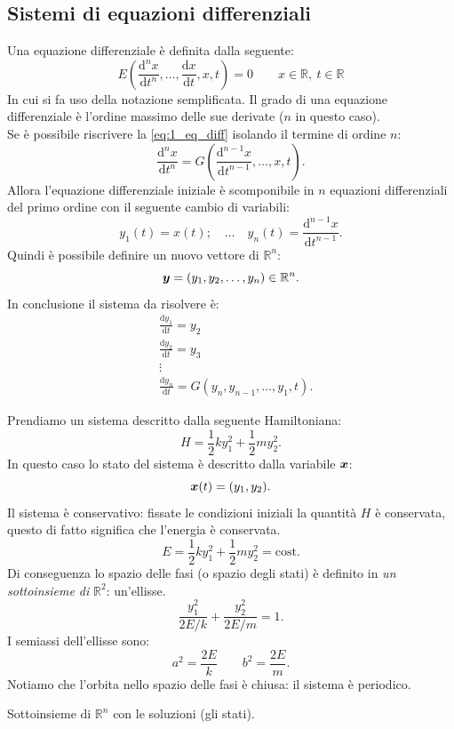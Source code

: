 \subsection{Sistemi di equazioni differenziali}%
\label{sub:Sistemi di equazioni differenziali}
Una equazione differenziale è definita dalla seguente:
\begin{equation}
    E\left(\frac{\text{d} ^n x}{\text{d} t^n} , \ldots, \frac{\text{d} x}{\text{d} t}, x, t\right) = 0 
    \qquad
    x \in \mathbb{R}, \ t \in \mathbb{R}
    \label{eq:1_eq_diff}
\end{equation}
In cui si fa uso della notazione semplificata. Il grado di una equazione differenziale è l'ordine massimo delle sue derivate ($n$ in questo caso).\\
Se è possibile riscrivere la \ref{eq:1_eq_diff} isolando il termine di ordine $n$:
\[
    \frac{\text{d}^n x}{\text{d} t^n} = G\left(\frac{\text{d} ^{n-1}x}{\text{d} t^{n-1}} , \ldots, x, t\right)
.\] 
Allora l'equazione differenziale iniziale è scomponibile in $n$  equazioni differenziali del primo ordine con il seguente cambio di variabili:
\[
    y_1(t) = x(t); \quad \ldots \quad y_n(t) = \frac{\text{d} ^{n-1}x}{\text{d} t^{n-1}} 
.\] 
Quindi è possibile definire un nuovo vettore di $\mathbb{R}^n$:
\[
    \boldsymbol{y}  = (y_1, y_2, \ldots, y_n) \in \mathbb{R}^n
.\] 
In conclusione il sistema da risolvere è:
\[\begin{aligned}
    & \frac{\text{d} y_1}{\text{d} t} = y_2\\
    & \frac{\text{d} y_2}{\text{d} t} = y_3\\
    & \vdots\\
    & \frac{\text{d} y_n}{\text{d} t} = G(y_n, y_{n-1}, \ldots, y_1, t)
.\end{aligned}\]
\begin{exmp}
    Prendiamo un sistema descritto dalla seguente Hamiltoniana:
    \[
        H = \frac{1}{2}ky_1^2 + \frac{1}{2}m y_2^2
    .\] 
    In questo caso lo stato del sistema è descritto dalla variabile $\boldsymbol{x}$:
    \[
	\boldsymbol{x}(t) = (y_1, y_2)
    .\] 
    Il sistema è conservativo: fissate le condizioni iniziali la quantità $H$ è conservata, questo di fatto significa che l'energia è conservata.
    \[
        E = \frac{1}{2}ky_1^2 + \frac{1}{2}m y_2^2 = \text{cost}
    .\] 
    Di conseguenza lo spazio delle fasi (o spazio degli stati) è definito in \textit{un sottoinsieme di }$\mathbb{R}^2$: un'ellisse.
    \[
        \frac{y_1^2}{2E /k} + \frac{y_2^2}{2E /m} = 1
    .\] 
    I semiassi dell'ellisse sono:
    \[
        a^2 = \frac{2E}{k} \qquad b^2 = \frac{2E}{m}
    .\] 
    Notiamo che l'orbita nello spazio delle fasi è chiusa: il sistema è periodico.
\end{exmp}
\noindent
\begin{defn}
    Sottoinsieme di $\mathbb{R}^n$ con le soluzioni (gli stati).
\end{defn}
\noindent
